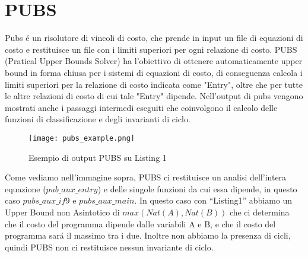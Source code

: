 \documentclass[../../main.tex]{subfiles}
\begin{document}
\section{PUBS}
\label{sec:pubs}
Pubs é un risolutore di vincoli di costo, che prende in input un file di equazioni di costo e restituisce un file con i limiti superiori per ogni relazione di costo.
PUBS (Pratical Upper Bounds Solver) ha l'obiettivo di ottenere automaticamente upper bound in forma chiusa per i sistemi di equazioni di costo, di conseguenza calcola i limiti superiori per la relazione di costo indicata come "Entry", oltre che per tutte le altre relazioni di costo di cui tale "Entry" dipende.
Nell'output di pubs vengono mostrati anche i passaggi intermedi eseguiti che coinvolgono il calcolo delle funzioni di classificazione e degli invarianti di ciclo.

\begin{figure}[H]
    \centering
    \texttt{[image: pubs\_example.png]}
    \caption{Esempio di output PUBS su Listing 1}
\end{figure}
Come vediamo nell'immagine sopra, PUBS ci restituisce un analisi dell'intera equazione ($pub\_aux\_entry$) e delle singole funzioni da cui essa dipende, in questo caso $pubs\_aux\_if9$ e $pubs\_aux\_main$.
In questo caso con ``Listing1'' abbiamo un Upper Bound non Asintotico di $max(Nat(A), Nat(B))$ che ci determina che il costo del programma dipende dalle variabili A e B, e che il costo del programma sará il massimo tra i due.
Inoltre non abbiamo la presenza di cicli, quindi PUBS non ci restituisce nessun invariante di ciclo.
\end{document}
